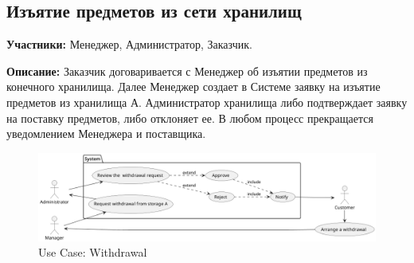 
\subsection{Изъятие предметов из сети хранилищ}

\textbf{Участники:}
Менеджер, Администратор, Заказчик.

\textbf{Описание:}
Заказчик договаривается с Менеджер об
изъятии предметов из конечного хранилища. Далее Менеджер 
создает в Системе заявку на изъятие предметов из 
хранилища А. Администратор хранилища либо подтверждает 
заявку на поставку предметов, либо отклоняет ее. В 
любом процесс прекращается уведомлением Менеджера и 
поставщика.

\begin{figure}[h]
  \centering
  \includegraphics[width=12cm]{../../doc/spec/figure/usecase/withdrawal_confirm/Storage Net, Use Case, Withdrawal.png}
  \caption{Use Case: Withdrawal}
\end{figure}
